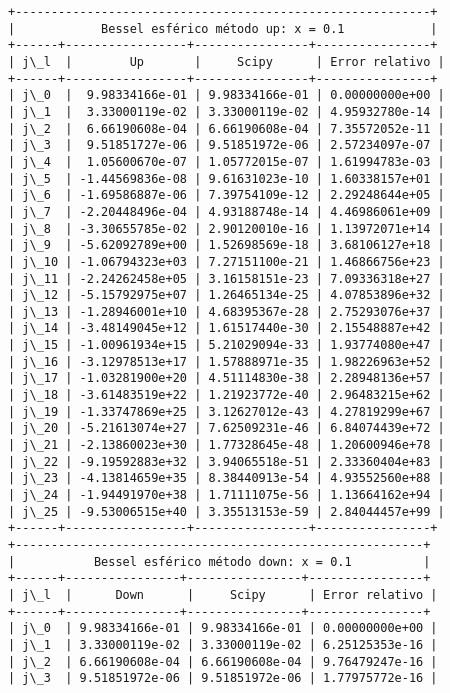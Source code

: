\documentclass[9pt]{article}
\begin{document}
    \begin{Verbatim}[commandchars=\\\{\}]
+----------------------------------------------------------+
|            Bessel esférico método up: x = 0.1            |
+------+-----------------+----------------+----------------+
| j\_l  |        Up       |     Scipy      | Error relativo |
+------+-----------------+----------------+----------------+
| j\_0  |  9.98334166e-01 | 9.98334166e-01 | 0.00000000e+00 |
| j\_1  |  3.33000119e-02 | 3.33000119e-02 | 4.95932780e-14 |
| j\_2  |  6.66190608e-04 | 6.66190608e-04 | 7.35572052e-11 |
| j\_3  |  9.51851727e-06 | 9.51851972e-06 | 2.57234097e-07 |
| j\_4  |  1.05600670e-07 | 1.05772015e-07 | 1.61994783e-03 |
| j\_5  | -1.44569836e-08 | 9.61631023e-10 | 1.60338157e+01 |
| j\_6  | -1.69586887e-06 | 7.39754109e-12 | 2.29248644e+05 |
| j\_7  | -2.20448496e-04 | 4.93188748e-14 | 4.46986061e+09 |
| j\_8  | -3.30655785e-02 | 2.90120010e-16 | 1.13972071e+14 |
| j\_9  | -5.62092789e+00 | 1.52698569e-18 | 3.68106127e+18 |
| j\_10 | -1.06794323e+03 | 7.27151100e-21 | 1.46866756e+23 |
| j\_11 | -2.24262458e+05 | 3.16158151e-23 | 7.09336318e+27 |
| j\_12 | -5.15792975e+07 | 1.26465134e-25 | 4.07853896e+32 |
| j\_13 | -1.28946001e+10 | 4.68395367e-28 | 2.75293076e+37 |
| j\_14 | -3.48149045e+12 | 1.61517440e-30 | 2.15548887e+42 |
| j\_15 | -1.00961934e+15 | 5.21029094e-33 | 1.93774080e+47 |
| j\_16 | -3.12978513e+17 | 1.57888971e-35 | 1.98226963e+52 |
| j\_17 | -1.03281900e+20 | 4.51114830e-38 | 2.28948136e+57 |
| j\_18 | -3.61483519e+22 | 1.21923772e-40 | 2.96483215e+62 |
| j\_19 | -1.33747869e+25 | 3.12627012e-43 | 4.27819299e+67 |
| j\_20 | -5.21613074e+27 | 7.62509231e-46 | 6.84074439e+72 |
| j\_21 | -2.13860023e+30 | 1.77328645e-48 | 1.20600946e+78 |
| j\_22 | -9.19592883e+32 | 3.94065518e-51 | 2.33360404e+83 |
| j\_23 | -4.13814659e+35 | 8.38440913e-54 | 4.93552560e+88 |
| j\_24 | -1.94491970e+38 | 1.71111075e-56 | 1.13664162e+94 |
| j\_25 | -9.53006515e+40 | 3.35513153e-59 | 2.84044457e+99 |
+------+-----------------+----------------+----------------+
+---------------------------------------------------------+
|           Bessel esférico método down: x = 0.1          |
+------+----------------+----------------+----------------+
| j\_l  |      Down      |     Scipy      | Error relativo |
+------+----------------+----------------+----------------+
| j\_0  | 9.98334166e-01 | 9.98334166e-01 | 0.00000000e+00 |
| j\_1  | 3.33000119e-02 | 3.33000119e-02 | 6.25125353e-16 |
| j\_2  | 6.66190608e-04 | 6.66190608e-04 | 9.76479247e-16 |
| j\_3  | 9.51851972e-06 | 9.51851972e-06 | 1.77975772e-16 |

\end{Verbatim}
\end{document}
